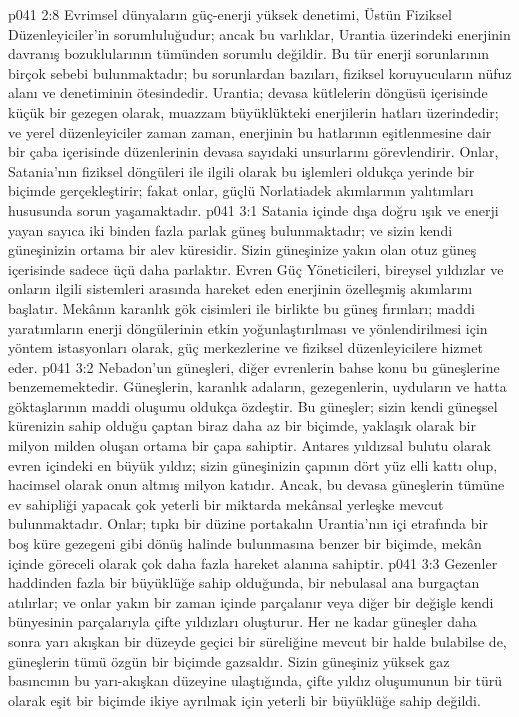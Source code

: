 \vs p041 2:8 Evrimsel dünyaların güç\hyp{}enerji yüksek denetimi, Üstün Fiziksel Düzenleyiciler’in sorumluluğudur; ancak bu varlıklar, Urantia üzerindeki enerjinin davranış bozuklularının tümünden sorumlu değildir. Bu tür enerji sorunlarının birçok sebebi bulunmaktadır; bu sorunlardan bazıları, fiziksel koruyucuların nüfuz alanı ve denetiminin ötesindedir. Urantia; devasa kütlelerin döngüsü içerisinde küçük bir gezegen olarak, muazzam büyüklükteki enerjilerin hatları üzerindedir; ve yerel düzenleyiciler zaman zaman, enerjinin bu hatlarının eşitlenmesine dair bir çaba içerisinde düzenlerinin devasa sayıdaki unsurlarını görevlendirir. Onlar, Satania’nın fiziksel döngüleri ile ilgili olarak bu işlemleri oldukça yerinde bir biçimde gerçekleştirir; fakat onlar, güçlü Norlatiadek akımlarının yalıtımları hususunda sorun yaşamaktadır.
\vs p041 3:1 Satania içinde dışa doğru ışık ve enerji yayan sayıca iki binden fazla parlak güneş bulunmaktadır; ve sizin kendi güneşinizin ortama bir alev küresidir. Sizin güneşinize yakın olan otuz güneş içerisinde sadece üçü daha parlaktır. Evren Güç Yöneticileri, bireysel yıldızlar ve onların ilgili sistemleri arasında hareket eden enerjinin özelleşmiş akımlarını başlatır. Mekânın karanlık gök cisimleri ile birlikte bu güneş fırınları; maddi yaratımların enerji döngülerinin etkin yoğunlaştırılması ve yönlendirilmesi için yöntem istasyonları olarak, güç merkezlerine ve fiziksel düzenleyicilere hizmet eder.
\vs p041 3:2 Nebadon’un güneşleri, diğer evrenlerin bahse konu bu güneşlerine benzememektedir. Güneşlerin, karanlık adaların, gezegenlerin, uyduların ve hatta göktaşlarının maddi oluşumu oldukça özdeştir. Bu güneşler; sizin kendi güneşsel kürenizin sahip olduğu çaptan biraz daha az bir biçimde, yaklaşık olarak bir milyon milden oluşan ortama bir çapa sahiptir. Antares yıldızsal bulutu olarak evren içindeki en büyük yıldız; sizin güneşinizin çapının dört yüz elli kattı olup, hacimsel olarak onun altmış milyon katıdır. Ancak, bu devasa güneşlerin tümüne ev sahipliği yapacak çok yeterli bir miktarda mekânsal yerleşke mevcut bulunmaktadır. Onlar; tıpkı bir düzine portakalın Urantia’nın içi etrafında bir boş küre gezegeni gibi dönüş halinde bulunmasına benzer bir biçimde, mekân içinde göreceli olarak çok daha fazla hareket alanına sahiptir.
\vs p041 3:3 Gezenler haddinden fazla bir büyüklüğe sahip olduğunda, bir nebulasal ana burgaçtan atılırlar; ve onlar yakın bir zaman içinde parçalanır veya diğer bir değişle kendi bünyesinin parçalarıyla çifte yıldızları oluşturur. Her ne kadar güneşler daha sonra yarı akışkan bir düzeyde geçici bir süreliğine mevcut bir halde bulabilse de, güneşlerin tümü özgün bir biçimde gazsaldır. Sizin güneşiniz yüksek gaz basıncının bu yarı\hyp{}akışkan düzeyine ulaştığında, çifte yıldız oluşumunun bir türü olarak eşit bir biçimde ikiye ayrılmak için yeterli bir büyüklüğe sahip değildi.
